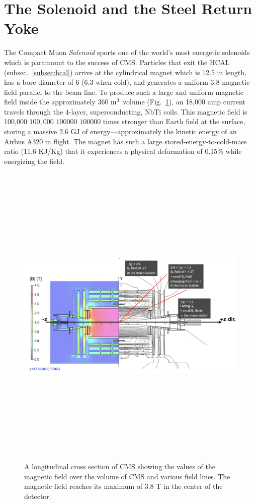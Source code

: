 \section{The Solenoid and the Steel Return Yoke}
\label{sec:solenoid}

The Compact Muon \emph{Solenoid} sports one of the world's most energetic solenoids which is paramount to the success of CMS.
Particles that exit the HCAL (subsec.~\ref{subsec:hcal}) arrive at the cylindrical magnet which is 12.5 \meter in length, has a bore diameter of 6 \meter (6.3 \meter when cold), and generates a uniform 3.8 \tesla magnetic field parallel to the beam line.
To produce such a large and uniform magnetic field inside the approximately 360 $\meter^3$ volume (Fig.~\ref{fig:cms_magnetic_field}), an 18,000 amp current travels through the 4-layer, superconducting, NbTi coils.
This magnetic field is 100,000 $100,000$  $100000$ $100 000$ times stronger than Earth field at the surface, storing a massive 2.6 GJ of energy---approximately the kinetic energy of an Airbus A320 in flight.
The magnet has such a large stored-energy-to-cold-mass ratio (11.6 KJ/Kg) that it experiences a physical deformation of 0.15\% while energizing the field.
\begin{figure}[pbth]
    \centering
    \includegraphics[width=15cm,height=15cm,keepaspectratio]{figures/cms/solenoid/CMS_longitudinal_view_magnetic_field.png}
        \caption{
        A longitudinal cross section of CMS showing the values of the magnetic field over the volume of CMS and various field lines. 
        The magnetic field reaches its maximum of 3.8 T in the center of the detector.}
        \label{fig:cms_magnetic_field}
    \end{figure}

